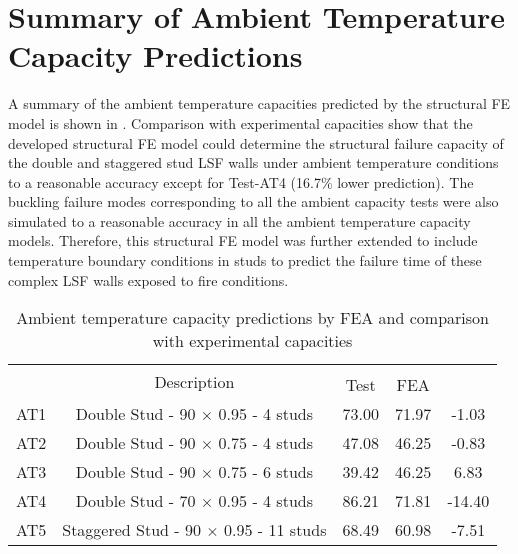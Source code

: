 \section{Summary of Ambient Temperature Capacity Predictions}

A summary of the ambient temperature capacities predicted by the structural FE model is shown in . Comparison with experimental capacities show that the developed structural FE model could determine the structural failure capacity of the double and staggered stud LSF walls under ambient temperature conditions to a reasonable accuracy except for Test-AT4 (16.7\% lower prediction). The buckling failure modes corresponding to all the ambient capacity tests were also simulated to a reasonable accuracy in all the ambient temperature capacity models. Therefore, this structural FE model was further extended to include temperature boundary conditions in studs to predict the failure time of these complex LSF walls exposed to fire conditions. 
\begin{table}[htbp]
	\centering
	\caption{Ambient temperature capacity predictions by FEA and comparison with experimental capacities}
	  \begin{tabular}{ccccc}
	  \toprule
	  \multicolumn{1}{m{3em}}{\multirow{2}{3em}{\centering{Test Name}}} & 
	  \multirow{2}[4]{*}{Description} & 
	  \multicolumn{2}{m{5.075em}}{\centering{Failure capacity (kN)}} & 
	  \multicolumn{1}{m{5em}}{\multirow{2}{4em}{\centering{Ratio of \newline{}FEA/Test capacity}}} \\
  \cmidrule{3-4}          &       & Test  & FEA   &  \\
	  \midrule
	  AT1   & Double Stud - 90 $\times$ 0.95 - 4 studs & 73.00 & 71.97 & -1.03 \\
	  AT2   & Double Stud - 90 $\times$ 0.75 - 4 studs & 47.08 & 46.25 & -0.83 \\
	  AT3   & Double Stud - 90 $\times$ 0.75 - 6 studs & 39.42 & 46.25 & 6.83 \\
	  AT4   & Double Stud - 70 $\times$ 0.95 - 4 studs & 86.21 & 71.81 & -14.40 \\
	  AT5   & Staggered  Stud - 90 $\times$ 0.95 - 11 studs & 68.49 & 60.98 & -7.51 \\
	  \bottomrule
	  \end{tabular}%
	\label{tab:ambient-test-results-fea}%
  \end{table}%
  
